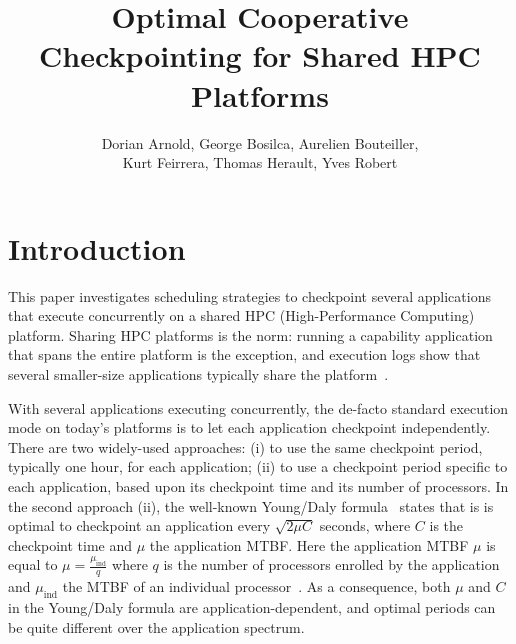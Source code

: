 \documentclass{article}
\author{Dorian Arnold, George Bosilca, Aurelien Bouteiller,\\
 Kurt Feirrera, Thomas Herault, Yves Robert}
\title{Optimal Cooperative Checkpointing for Shared HPC Platforms}
\newcommand{\muind}{\mu_{\text{ind}}}
\begin{document}
\maketitle

\section{Introduction}

This paper investigates scheduling strategies to checkpoint several applications
that execute concurrently on a shared HPC (High-Performance Computing) platform.
Sharing HPC platforms is the norm: running a capability application that spans the entire platform
is the exception, and execution logs show that several smaller-size applications typically share the platform~\cite{xx}.

With several applications executing concurrently, the de-facto standard execution mode on today's platforms is to let each application checkpoint independently. There are two widely-used approaches: (i) to use the same checkpoint period, typically one hour, for each application; (ii) to use a checkpoint period specific to each application, based upon its checkpoint time and its number of processors. In the second approach (ii), the well-known Young/Daly formula~\cite{young74,daly04} states that is is optimal to checkpoint an application
every $\sqrt{2 \mu C}$ seconds, where $C$ is the checkpoint time and $\mu$ the application MTBF.
Here the application MTBF $\mu$ is equal to $\mu = \frac{\muind}{q}$ where $q$ is the number of processors enrolled by the application and $\muind$ the MTBF of an individual processor~\cite{springer-monograph}. As a consequence, both $\mu$ and $C$ 
in the Young/Daly formula are application-dependent, and optimal periods can be quite different
over the application spectrum.
\end{document}
